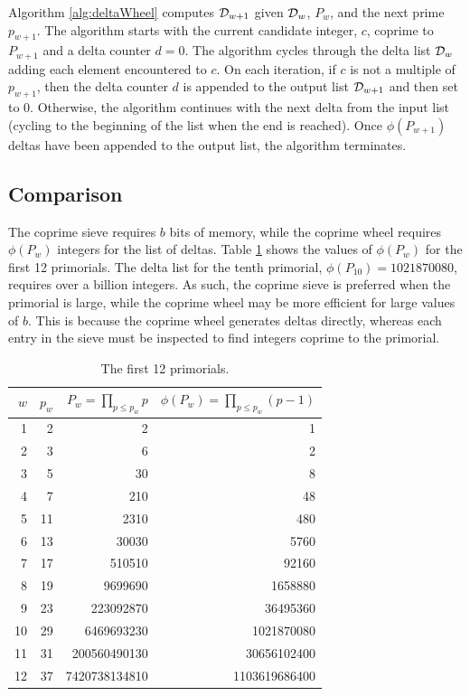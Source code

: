 \documentclass{ucalgthes1}
\theoremstyle{definition}
\begin{document}
Algorithm \ref{alg:deltaWheel} computes $\mathcal D_{w+1}$ given $\mathcal D_w$, $P_w$, and the next prime $p_{w+1}$.  The algorithm starts with the current candidate integer, $c$, coprime to $P_{w+1}$ and a delta counter $d = 0$.  The algorithm cycles through the delta list $\mathcal D_w$ adding each element encountered to $c$.  On each iteration, if $c$ is not a multiple of $p_{w+1}$, then the delta counter $d$ is appended to the output list $\mathcal D_{w+1}$ and then set to 0.  Otherwise, the algorithm continues with the next delta from the input list (cycling to the beginning of the list when the end is reached).  Once $\phi(P_{w+1})$ deltas have been appended to the output list, the algorithm terminates.

\subsection{Comparison}

The coprime sieve requires $b$ bits of memory, while the coprime wheel requires $\phi(P_w)$ integers for the list of deltas.  Table \ref{tab:primorialRateOfGrowth} shows the values of $\phi(P_w)$ for the first 12 primorials.  The delta list for the tenth primorial, $\phi(P_{10}) = 1021870080$, requires over a billion integers.  As such, the coprime sieve is preferred when the primorial is large, while the coprime wheel may be more efficient for large values of $b$.  This is because the coprime wheel generates deltas directly, whereas each entry in the sieve must be inspected to find integers coprime to the primorial.

\begin{table}[htb]
\centering
\begin{tabular}{| r | r | r | r |}
	\hline
	$w$ & $p_w$ & $P_w = \prod_{p \le p_w} p$ & $\phi(P_w) = \prod_{p \le p_w} (p-1)$ \\
	\hline
1 & 2 & 2 & 1 \\
2 & 3 & 6 & 2 \\
3 & 5 & 30 & 8 \\
4 & 7 & 210 & 48 \\
5 & 11 & 2310 & 480 \\
6 & 13 & 30030 & 5760 \\
7 & 17 & 510510 & 92160 \\
8 & 19 & 9699690 & 1658880 \\
9 & 23 & 223092870 & 36495360 \\
10 & 29 & 6469693230 & 1021870080 \\
11 & 31 & 200560490130 & 30656102400 \\
12 & 37 & 7420738134810 & 1103619686400 \\
	\hline
\end{tabular}
\caption{The first 12 primorials.}
\label{tab:primorialRateOfGrowth}
\end{table}
\end{document}
